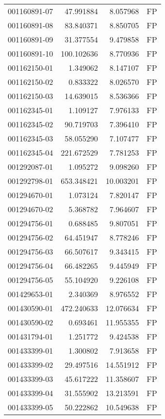 \begin{tabular}{lrrl}
001160891-07 &   47.991884 &     8.057968 &   FP \\
001160891-08 &   83.840371 &     8.850705 &   FP \\
001160891-09 &   31.377554 &     9.479858 &   FP \\
001160891-10 &  100.102636 &     8.770936 &   FP \\
001162150-01 &    1.349062 &     8.147107 &   FP \\
001162150-02 &    0.833322 &     8.026570 &   FP \\
001162150-03 &   14.639015 &     8.536366 &   FP \\
001162345-01 &    1.109127 &     7.976133 &   FP \\
001162345-02 &   90.719703 &     7.396410 &   FP \\
001162345-03 &   58.055290 &     7.107477 &   FP \\
001162345-04 &  221.672529 &     7.781253 &   FP \\
001292087-01 &    1.095272 &     9.098260 &   FP \\
001292798-01 &  653.348421 &    10.003201 &   FP \\
001294670-01 &    1.073124 &     7.820147 &   FP \\
001294670-02 &    5.368782 &     7.964607 &   FP \\
001294756-01 &    0.688485 &     9.807051 &   FP \\
001294756-02 &   64.451947 &     8.778246 &   FP \\
001294756-03 &   66.507617 &     9.343415 &   FP \\
001294756-04 &   66.482265 &     9.445949 &   FP \\
001294756-05 &   55.104920 &     9.226108 &   FP \\
001429653-01 &    2.340369 &     8.976552 &   FP \\
001430590-01 &  472.240633 &    12.076634 &   FP \\
001430590-02 &    0.693461 &    11.955355 &   FP \\
001431794-01 &    1.251772 &     9.424538 &   FP \\
001433399-01 &    1.300802 &     7.913658 &   FP \\
001433399-02 &   29.497516 &    14.551912 &   FP \\
001433399-03 &   45.617222 &    11.358607 &   FP \\
001433399-04 &   31.555902 &    13.213591 &   FP \\
001433399-05 &   50.222862 &    10.549638 &   FP \\

\end{tabular}
